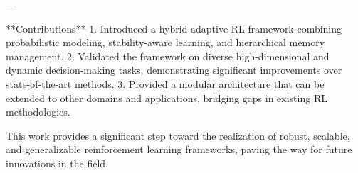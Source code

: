---

**Contributions**  
1. Introduced a hybrid adaptive RL framework combining probabilistic modeling, stability-aware learning, and hierarchical memory management.  
2. Validated the framework on diverse high-dimensional and dynamic decision-making tasks, demonstrating significant improvements over state-of-the-art methods.  
3. Provided a modular architecture that can be extended to other domains and applications, bridging gaps in existing RL methodologies.  

This work provides a significant step toward the realization of robust, scalable, and generalizable reinforcement learning frameworks, paving the way for future innovations in the field.  